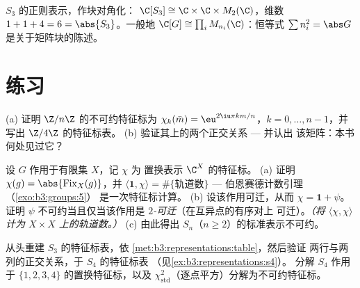 \begin{omfigure}

{\small $S_3$ 的正则表示，作块对角化：
$\C[S_3] \cong \C \times \C \times M_2(\C)$，维数 $1 + 1 +
4 = 6 = \abs{S_3}$。一般地 $\C[G] \cong \prod_i
M_{n_i}(\C)$：恒等式 $\sum n_i^2 = \abs G$
是关于矩阵块的陈述。}
\end{omfigure}

\section{练习}

\begin{exercise}[$\star$]\label{exo:b3:representations:1}
(a) 证明 $\Z/n\Z$ 的不可约特征标为
$\chi_k(\bar m) = \eu^{2\iu\pi km/n}$，$k = 0, \dots, n-1$，并
写出 $\Z/4\Z$ 的特征标表。
(b) 验证其上的两个正交关系 --- 并认出
该矩阵：本书何处见过它？
\end{exercise}

\begin{exercise}[$\star$]\label{exo:b3:representations:2}
设 $G$ 作用于有限集 $X$，记 $\chi$ 为
置换表示 $\C^X$ 的特征标。
(a) 证明 $\chi(g) = \abs{\operatorname{Fix}_X(g)}$，并
$\langle \mathbf 1, \chi\rangle = \#\{\text{轨道数}\}$ ---
伯恩赛德计数引理（\cref{exo:b3:groups:5}）
是一次特征标计算。
(b) 设该作用可迁，从而 $\chi = \mathbf 1 +
\psi$。证明 $\psi$ 不可约当且仅当该作用是
\emph{$2$-可迁}（在互异点的有序对上
可迁）。\emph{（将 $\langle\chi,\chi\rangle$ 计为
$X \times X$ 上的轨道数。）}
(c) 由此得出 $S_n$（$n \geq
2$）的标准表示不可约。
\end{exercise}

\begin{exercise}[$\star$]\label{exo:b3:representations:3}
从头重建 $S_3$ 的特征标表，依
\cref{met:b3:representations:table}，然后验证
两行与两列的正交关系，于 $S_4$ 的特征标表
（见\cref{ex:b3:representations:s4}）。
分解 $S_4$ 作用于 $\{1,2,3,4\}$ 的置换特征标，以及
$\chi_{\mathrm{std}}^2$（逐点平方）分解为不可约特征标。
\end{exercise}

